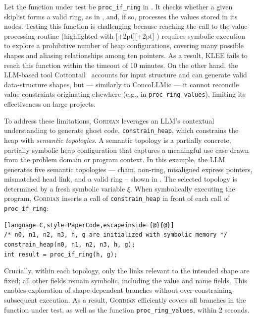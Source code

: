 \documentclass[acmsmall]{acmart}
\newcommand{\gordianhighlight}[2]{%
  \begingroup
  \setlength{\fboxsep}{0pt}%
  \colorbox{#1}{\kern1pt\raisebox{0pt}[\dimexpr\height+2pt\relax][\dimexpr\depth+2pt\relax]{#2}\kern1pt}%
  \endgroup
}
\newcommand{\hlg}[1]{\gordianhighlight{green!50}{#1}}
\newcommand{\projName}{\textsc{Gordian}\xspace}
\theoremstyle{definition}
\begin{document}
Let the function under test be \lstinline[style=PaperCode]|proc_if_ring| in . It checks whether a given skiplist forms a valid ring, as in , and, if so, processes the values stored in its nodes. Testing this function is challenging because reaching the call to the value-processing routine (highlighted with \hlg{\phantom{X}}) requires symbolic execution to explore a prohibitive number of heap configurations, covering many possible shapes and aliasing relationships among ten pointers. As a result, KLEE fails to reach this function within the timeout of 10 minutes. On the other hand, the LLM-based tool Cottontail~\cite{cottontail} accounts for input structure and can generate valid data-structure shapes, but --- similarly to ConcoLLMic --- it cannot reconcile value constraints originating elsewhere (e.g., in \texttt{proc\_ring\_values}), limiting its effectiveness on large projects.

To address these limitations, \projName leverages an LLM's contextual understanding to generate ghost code, \texttt{constrain\_heap}, which constrains the heap with \emph{semantic topologies}. A semantic topology is a partially concrete, partially symbolic heap configuration that captures a meaningful use case drawn from the problem domain or program context. In this example, the LLM generates five semantic topologies --- chain, non-ring, misaligned express pointers, mismatched head link, and a valid ring -- shown in . The selected topology is determined by a fresh symbolic variable $\xi$. When symbolically executing the program, \projName inserts a call of \texttt{constrain\_heap} in front of each call of \lstinline[style=PaperCode]|proc_if_ring|:

{\scriptsize
\begin{lstlisting}[language=C,style=PaperCode,escapeinside={@}{@}]
/* n0, n1, n2, n3, h, g are initialized with symbolic memory */
constrain_heap(n0, n1, n2, n3, h, g);
int result = proc_if_ring(h, g);
\end{lstlisting}
}

\noindent Crucially, within each topology, only the links relevant to the intended shape are fixed; all other fields remain symbolic, including the value and name fields. This enables exploration of shape-dependent branches without over-constraining subsequent execution. As a result, \projName efficiently covers all branches in the function under test, as well as the function \texttt{proc\_ring\_values}, within 2 seconds.
\end{document}
